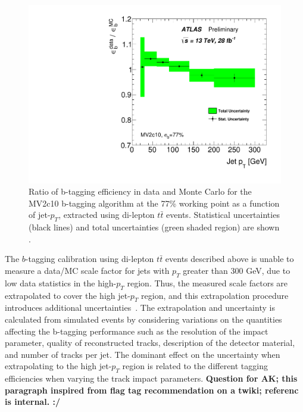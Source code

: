 \begin{figure}[!ht]
  \captionsetup[subfigure]{aboveskip=-5pt,justification=centering}
  \begin{center}
    \includegraphics[width=0.7\linewidth, angle=0]{figs/Objects/bjets_calib_pt.pdf} 
  \end{center}
  \caption[Ratio of b-tagging efficiency in data and Monte Carlo for the MV2c10 b-tagging algorithm at the 77\% working point as a function of jet-$p_T$,
    extracted using di-lepton $t\bar{t}$ events. Statistical uncertainties (black lines) and total uncertainties (green shaded region) are shown.]
          {Ratio of b-tagging efficiency in data and Monte Carlo for the MV2c10 b-tagging algorithm at the 77\% working point as a function of jet-$p_T$,
    extracted using di-lepton $t\bar{t}$ events. Statistical uncertainties (black lines) and total uncertainties (green shaded region) are shown \cite{obj-bjets_calib_plots}.}
  \label{fig:obj-bjets_calib}
\end{figure}

The $b$-tagging calibration using di-lepton $t\bar{t}$ events described above
is unable to measure a data/MC scale factor for jets with $p_T$ greater than 300 GeV, due to low data statistics in the high-$p_T$ region.
Thus, the measured scale factors are extrapolated to cover the high jet-$p_T$ region, and this extrapolation procedure introduces additional uncertainties~\cite{obj-bjets_calib_highPt}.
The extrapolation and uncertainty is calculated from simulated events by considering variations on the quantities affecting the b-tagging performance
such as the resolution of the impact parameter, quality of reconstructed tracks, description of the detector material, and number of tracks per jet.
The dominant effect on the uncertainty when extrapolating to the high jet-$p_T$ region is related to the different tagging efficiencies
when varying the track impact parameters. 
\textbf{Question for AK; this paragraph inspired from flag tag recommendation on a twiki; referenc is internal. :/}

